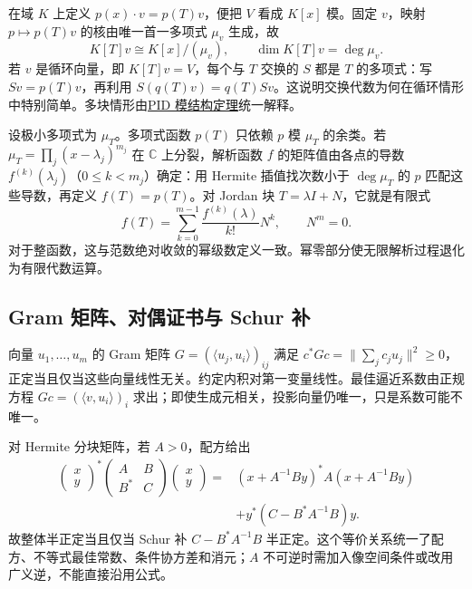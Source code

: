 \documentclass[12pt,fontset=fandol]{ctexart}
\begin{document}
\label{app:linear-cyclic}

在域 $K$ 上定义 $p(x)\cdot v=p(T)v$，便把 $V$ 看成 $K[x]$ 模。固定 $v$，映射 $p\mapsto p(T)v$ 的核由唯一首一多项式 $\mu_v$ 生成，故
\[
K[T]v\cong K[x]/(\mu_v),\qquad\dim K[T]v=\deg\mu_v.
\]
若 $v$ 是循环向量，即 $K[T]v=V$，每个与 $T$ 交换的 $S$ 都是 $T$ 的多项式：写 $Sv=p(T)v$，再利用 $S(q(T)v)=q(T)Sv$。这说明交换代数为何在循环情形中特别简单。多块情形由\hyperref[app:algebra-modules]{PID 模结构定理}统一解释。

设极小多项式为 $\mu_T$。多项式函数 $p(T)$ 只依赖 $p$ 模 $\mu_T$ 的余类。若 $\mu_T=\prod_j(x-\lambda_j)^{m_j}$ 在 $\mathbb C$ 上分裂，解析函数 $f$ 的矩阵值由各点的导数 $f^{(k)}(\lambda_j)$（$0\leq k<m_j$）确定：用 Hermite 插值找次数小于 $\deg\mu_T$ 的 $p$ 匹配这些导数，再定义 $f(T)=p(T)$。对 Jordan 块 $T=\lambda I+N$，它就是有限式
\[
f(T)=\sum_{k=0}^{m-1}\frac{f^{(k)}(\lambda)}{k!}N^k,
\qquad N^m=0.
\]
对于整函数，这与范数绝对收敛的幂级数定义一致。幂零部分使无限解析过程退化为有限代数运算。

\subsection{Gram 矩阵、对偶证书与 Schur 补}

\label{app:linear-gram}

向量 $u_1,\ldots,u_m$ 的 Gram 矩阵 $G=(\langle u_j,u_i\rangle)_{ij}$ 满足 $c^*Gc=\|\sum_jc_ju_j\|^2\geq0$，正定当且仅当这些向量线性无关。约定内积对第一变量线性。最佳逼近系数由正规方程 $Gc=(\langle v,u_i\rangle)_i$ 求出；即使生成元相关，投影向量仍唯一，只是系数可能不唯一。

对 Hermite 分块矩阵，若 $A>0$，配方给出
\[
\begin{aligned}
\begin{pmatrix}x\\y\end{pmatrix}^*
\begin{pmatrix}A&B\\B^*&C\end{pmatrix}
\begin{pmatrix}x\\y\end{pmatrix}
={}&(x+A^{-1}By)^*A(x+A^{-1}By)\\
&+y^*(C-B^*A^{-1}B)y.
\end{aligned}
\]
故整体半正定当且仅当 Schur 补 $C-B^*A^{-1}B$ 半正定。这个等价关系统一了配方、不等式最佳常数、条件协方差和消元；$A$ 不可逆时需加入像空间条件或改用广义逆，不能直接沿用公式。
\end{document}
